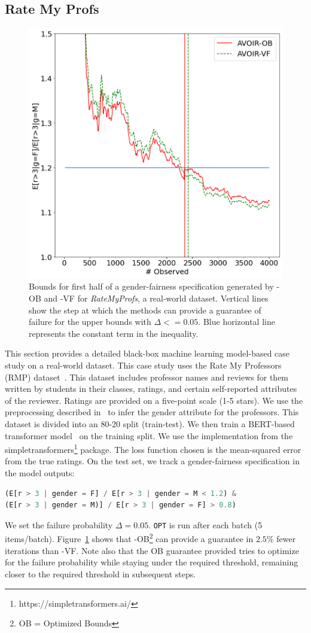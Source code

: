 \subsection{Rate My Profs}
\label{sec:casestudy:rmp}
\begin{figure}
    \includegraphics[width=0.5\linewidth]{avoir/images/ratemyprofs.png}
    \caption{Bounds for first half of a gender-fairness specification generated by \AVOIRmethodname{}-OB and \AVOIRmethodname{}-VF for \textit{RateMyProfs}, a real-world dataset. Vertical lines show the step at which the methods can provide a guarantee of failure for the upper bounds with $\Delta <= 0.05$. Blue horizontal line represents the constant term in the inequality.}
    \label{fig:casestudy:rmp}
\end{figure}
This section provides a detailed black-box machine learning model-based case study on a real-world dataset.
This case study uses the Rate My Professors (RMP) dataset~\cite{keymanesh2021fairness}. 
This dataset includes professor names and reviews for them written by students in their classes, ratings, and certain self-reported attributes of the reviewer.
Ratings are provided on a five-point scale (1-5 stars).
We use the preprocessing described in~\cite{keymanesh2021fairness} to infer the gender attribute for the professors.
This dataset is divided into an 80-20 split (train-test).
We then train a BERT-based transformer model~\cite{devlin2019bert} on the training split.
We use the implementation from the simpletransformers\footnote{https://simpletransformers.ai/} package.
The loss function chosen is the mean-squared error from the true ratings.
On the test set, we track a gender-fairness specification in the model outputs:
\begin{lstlisting}[columns=flexible, language=Python, basicstyle=\small]
(E[r > 3 | gender = F] / E[r > 3 | gender = M < 1.2) & 
(E[r > 3 | gender = M)] / E[r > 3 | gender = F] > 0.8)
\end{lstlisting}
We set the failure probability $\Delta = 0.05$. 
\texttt{OPT} is run after each batch (5 items/batch).
Figure~\ref{fig:casestudy:rmp} shows that \AVOIRmethodname{}-OB\footnote{OB = Optimized Bounds} can provide a guarantee in $\mathbf{2.5\%}$ fewer iterations than \AVOIRmethodname{}-VF. 
Note also that the OB guarantee provided tries to optimize for the failure probability while staying under the required threshold, remaining closer to the required threshold in subsequent steps.


